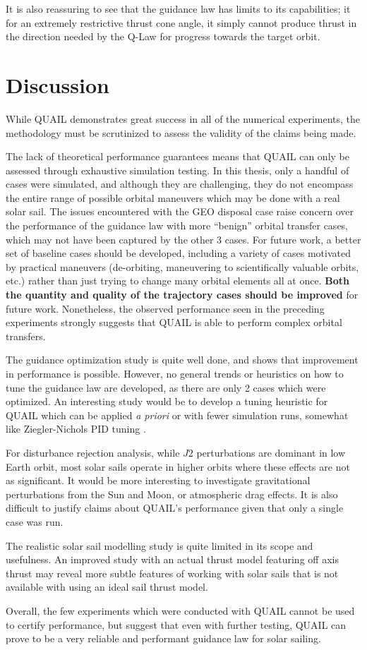 It is also reassuring to see that the guidance law has limits to its capabilities; it for an extremely restrictive thrust cone angle, it simply cannot produce thrust in the direction needed by the Q-Law for progress towards the target orbit.

\section{Discussion}
While QUAIL demonstrates great success in all of the numerical experiments, the methodology must be scrutinized to assess the validity of the claims being made.

The lack of theoretical performance guarantees means that QUAIL can only be assessed through exhaustive simulation testing. In this thesis, only a handful of cases were simulated, and although they are challenging, they do not encompass the entire range of possible orbital maneuvers which may be done with a real solar sail. The issues encountered with the GEO disposal case raise concern over the performance of the guidance law with more ``benign'' orbital transfer cases, which may not have been captured by the other 3 cases. For future work, a better set of baseline cases should be developed, including a variety of cases motivated by practical maneuvers (de-orbiting, maneuvering to scientifically valuable orbits, etc.) rather than just trying to change many orbital elements all at once. \textbf{Both the quantity and quality of the trajectory cases should be improved} for future work. Nonetheless, the observed performance seen in the preceding experiments strongly suggests that QUAIL is able to perform complex orbital transfers.

The guidance optimization study is quite well done, and shows that improvement in performance is possible. However, no general trends or heuristics on how to tune the guidance law are developed, as there are only 2 cases which were optimized. An interesting study would be to develop a tuning heuristic for QUAIL which can be applied \textit{a priori} or with fewer simulation runs, somewhat like Ziegler-Nichols PID tuning \cite{ziegler1942optimum}.

For disturbance rejection analysis, while \(J2\) perturbations are dominant in low Earth orbit, most solar sails operate in higher orbits where these effects are not as significant. It would be more interesting to investigate gravitational perturbations from the Sun and Moon, or atmospheric drag effects. It is also difficult to justify claims about QUAIL's performance given that only a single case was run.

The realistic solar sail modelling study is quite limited in its scope and usefulness. An improved study with an actual thrust model featuring off axis thrust may reveal more subtle features of working with solar sails that is not available with using an ideal sail thrust model.

Overall, the few experiments which were conducted with QUAIL cannot be used to certify performance, but suggest that even with further testing, QUAIL can prove to be a very reliable and performant guidance law for solar sailing.